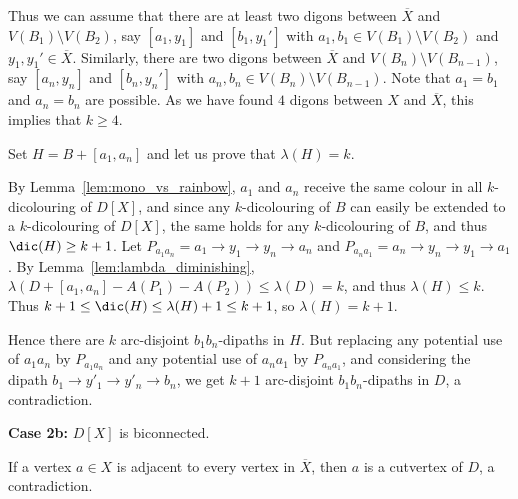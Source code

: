     Thus we can assume that there are at least two digons between $\overline{X}$ and $V(B_1) \setminus V(B_2)$, say $[a_1,y_1]$ and $[b_1,y_1']$ with $a_1, b_1 \in V(B_1) \setminus V(B_2)$ and $y_1,  y_1' \in \overline{X}$. 
    Similarly, there are two digons between $\overline{X}$ and $V(B_n) \setminus V(B_{n-1})$, say $[a_n,y_n]$ and $[b_n,y_n']$ with $a_n, b_n \in V(B_n) \setminus V(B_{n-1})$. 
    Note that $a_1 = b_1$ and $a_n = b_n$ are possible. As we have found $4$ digons between $X$ and $\overline{X}$, this implies that $k \geq 4$.

    Set $H= B + [a_1, a_n]$ and let us prove that $\lambda(H) = k$. 
    
    By Lemma~\ref{lem:mono_vs_rainbow}, $a_1$ and $a_n$ receive the same colour in all $k$-dicolouring of $D[X]$, and since any $k$-dicolouring of $B$ can easily be extended to a $k$-dicolouring of $D[X]$, the same holds for any $k$-dicolouring of $B$, and thus  
    $\dic(H) \geq k+1$. Let $ P_{a_1a_n} = a_1 \rightarrow y_1 \rightarrow y_n \rightarrow a_n$ and  $P_{a_na_1} = a_n \rightarrow y_n \rightarrow y_1 \rightarrow a_1$. 
    By Lemma~\ref{lem:lambda_diminishing},  $\lambda(D+[a_1, a_n] - A(P_1) - A(P_2)) \leq \lambda(D) = k$, and thus $\lambda(H) \leq k$. 
    Thus $k+1 \leq \dic(H) \leq  \lambda(H) + 1 \leq k+1$, so $\lambda(H) = k+1$. 
        
    Hence there are $k$ arc-disjoint $b_1 b_n$-dipaths in $H$. But replacing any potential use of $a_1a_n$ by $P_{a_1a_n}$ and any potential use of $a_na_1$ by $P_{a_na_1}$, and considering the dipath $b_1 \rightarrow y'_1 \rightarrow y'_n \rightarrow b_n$, we get $k+1$ arc-disjoint  $b_1b_n$-dipaths in $D$, a contradiction.
    \medskip 
    
    \noindent\textbf{Case 2b:} $D[X]$ is biconnected.



    If a vertex $a \in X$ is adjacent to every vertex in $\overline{X}$, then $a$ is a cutvertex of $D$, a contradiction.%

    
